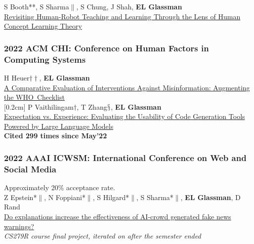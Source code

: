 \documentclass[10pt, a4paper]{article}
\newcommand{\years}[1]{\marginnote{\normalsize #1}}
\begin{document}
\years{\textbf{C25}}S Booth**, S Sharma$\|$, S Chung, J Shah, \textbf{EL Glassman}\\
\href{http://glassmanlab.seas.harvard.edu/papers/booth_hri2022.pdf}{Revisiting Human-Robot Teaching and Learning Through the Lens of Human Concept Learning Theory}
\subsubsection*{2022 ACM \textbf{CHI}: Conference on Human Factors in Computing Systems}

\years{\textbf{C24}}H Heuer$\dagger\dagger$, \textbf{EL Glassman}\\
\href{http://glassmanlab.seas.harvard.edu/papers/who_checklist_chi22.pdf}{A Comparative Evaluation of Interventions Against Misinformation: Augmenting the WHO~Checklist}\\
[0.2cm]
\years{\textbf{C23} LBW}P Vaithilingam$\dagger$, T Zhang$\mathsection$, \textbf{EL Glassman}\\
\href{http://glassmanlab.seas.harvard.edu/papers/chi2022-lbw-copilot.pdf}{Expectation vs. Experience: Evaluating the Usability of Code Generation Tools Powered by Large Language Models}\\
\textbf{Cited 299 times since May'22}

\subsubsection*{2022 AAAI \textbf{ICWSM}: International Conference on Web and Social Media}
Approximately 20\% acceptance rate.\\

\years{\textbf{C22}}Z Epstein*$\|$, N Foppiani*$\|$, S Hilgard*$\|$, S Sharma*$\|$, \textbf{EL Glassman}, D Rand\\
\href{http://glassmanlab.seas.harvard.edu/papers/epsteinEtAl_CS279_icwsm.pdf}{Do explanations increase the effectiveness of AI-crowd generated fake news warnings?}\\
\textit{CS279R course final project, iterated on after the semester ended}
\end{document}

